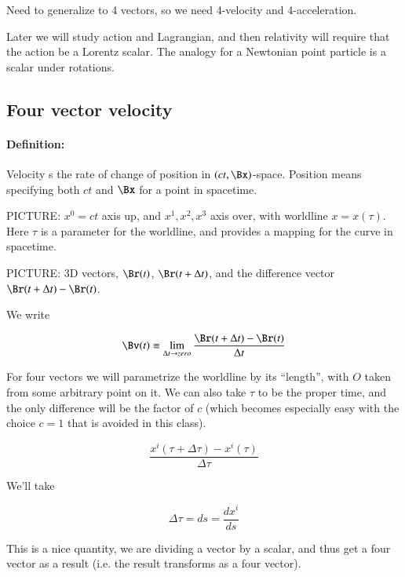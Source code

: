 Need to generalize to 4 vectors, so we need 4-velocity and 4-acceleration.

Later we will study action and Lagrangian, and then relativity will require that the action be a Lorentz scalar.  The analogy for a Newtonian point particle is a scalar under rotations.

\subsection{Four vector velocity}

\paragraph{Definition:} Velocity s the rate of change of position in $(ct, \Bx)$-space.  Position means specifying both $ct$ and $\Bx$ for a point in spacetime.

PICTURE: $x^0 = ct$ axis up, and $x^1, x^2, x^3$ axis over, with worldline $x = x(\tau)$.  Here $\tau$ is a parameter for the worldline, and provides a mapping for the curve in spacetime.

PICTURE: 3D vectors, $\Br(t)$, $\Br(t + \Delta t)$, and the difference vector $\Br(t + \Delta t) - \Br(t)$.

We write

\begin{equation}\label{eqn:relativisticElectrodynamicsL7:40}
\Bv(t) \equiv \lim_{\Delta t \rightarrow zero} \frac{\Br(t + \Delta t) - \Br(t)}{ \Delta t}
\end{equation}

For four vectors we will parametrize the worldline by its ``length'', with $O$ taken from some arbitrary point on it.  We can also take $\tau$ to be the proper time, and the only difference will be the factor of $c$ (which becomes especially easy with the choice $c=1$ that is avoided in this class).

\begin{equation}\label{eqn:relativisticElectrodynamicsL7:50}
\frac{x^i(\tau + \Delta \tau) - x^i(\tau)}{\Delta \tau}
\end{equation}

We'll take

\begin{equation}\label{eqn:relativisticElectrodynamicsL7:60}
\Delta \tau = ds = \frac{dx^i}{ds}
\end{equation}

This is a nice quantity, we are dividing a vector by a scalar, and thus get a four vector as a result (i.e. the result transforms as a four vector).

